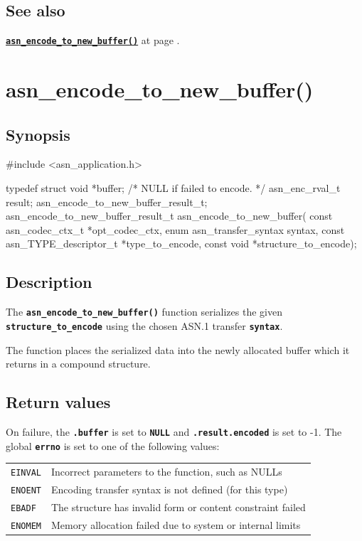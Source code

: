 \documentclass[english,oneside,12pt]{book}
\newcommand{\apisection}[2]{\clearpage\section{\label{#1}#2}}
\newcommand{\api}[2]{\hyperref[#1]{\code{#2}}}
\newcommand{\seealso}[2]{\api{#1}{#2} at page \pageref{#1}}
\newcommand{\code}[1]{\texttt{\textbf{\lstinline{#1}}}}
\begin{document}
\subsection*{See also}
\seealso{sec:asn_encode_to_new_buffer}{asn_encode_to_new_buffer()}.

\apisection{sec:asn_encode_to_new_buffer}{asn\_encode\_to\_new\_buffer()}

\subsection*{Synopsis}

\begin{signature}
#include <asn_application.h>

typedef struct {
    void *buffer;   /* NULL if failed to encode. */
    asn_enc_rval_t result;
} asn_encode_to_new_buffer_result_t;
asn_encode_to_new_buffer_result_t asn_encode_to_new_buffer(
    const asn_codec_ctx_t *opt_codec_ctx,
    enum asn_transfer_syntax syntax,
    const asn_TYPE_descriptor_t *type_to_encode,
    const void *structure_to_encode);
\end{signature}

\subsection*{Description}

The \code{asn_encode_to_new_buffer()} function serializes the given \code{structure_to_encode} using the chosen ASN.1 transfer \code{syntax}.

The function places the serialized data into the newly allocated buffer
which it returns in a compound structure.

\subsection*{Return values}

On failure, the \code{.buffer} is set to \code{NULL}
and \code{.result.encoded} is set to -1. The global \code{errno} is set
to one of the following values:

\begin{tabular}[h!]{ll}
\texttt{EINVAL} & Incorrect parameters to the function, such as NULLs \\
\texttt{ENOENT} & Encoding transfer syntax is not defined (for this type) \\
\texttt{EBADF} & The structure has invalid form or content constraint failed \\
\texttt{ENOMEM} & Memory allocation failed due to system or internal limits
\end{tabular}
\end{document}
